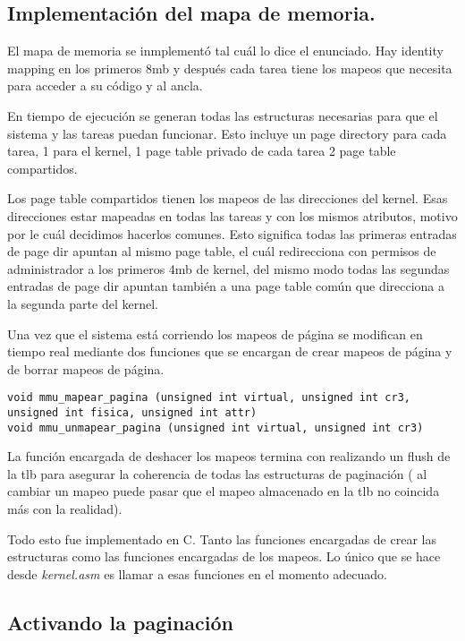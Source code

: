 \subsection{Implementación del mapa de memoria.}
	El mapa de memoria se inmplementó tal cuál lo dice el enunciado. Hay
identity mapping en los primeros 8mb y después cada tarea tiene
los mapeos que necesita para acceder a su código y al ancla.
	
	En tiempo de ejecución se generan todas las estructuras necesarias
para que el sistema y las tareas puedan funcionar. Esto incluye un page directory para cada
tarea, 1 para el kernel, 1 page table privado de cada tarea 2 page table compartidos.

	Los page table compartidos tienen los mapeos de las direcciones del kernel.
Esas direcciones estar mapeadas en todas las tareas y con los mismos atributos, motivo
por le cuál decidimos hacerlos comunes. Esto significa todas las primeras entradas
de page dir apuntan al mismo page table, el cuál redirecciona con permisos de administrador
a los primeros 4mb de kernel, del mismo modo todas las segundas entradas
de page dir apuntan también a una page table común que direcciona
a la segunda parte del kernel.

	Una vez que el sistema está corriendo los mapeos de página se modifican
en tiempo real mediante dos funciones que se encargan de crear
mapeos de página y de borrar mapeos de página.

\begin{verbatim}
void mmu_mapear_pagina (unsigned int virtual, unsigned int cr3, unsigned int fisica, unsigned int attr) 
void mmu_unmapear_pagina (unsigned int virtual, unsigned int cr3) 
\end{verbatim}

	La función encargada de deshacer los mapeos termina con realizando un flush
de la tlb para asegurar la coherencia de todas las estructuras de paginación (
al cambiar un mapeo puede pasar que el mapeo almacenado en la tlb no coincida
más con la realidad).

	Todo esto fue implementado en C. Tanto las funciones
encargadas de crear las estructuras como las funciones encargadas
de los mapeos. Lo único que se hace desde \textit{kernel.asm} es
llamar a esas funciones en el momento adecuado.

\subsection{Activando la paginación}

